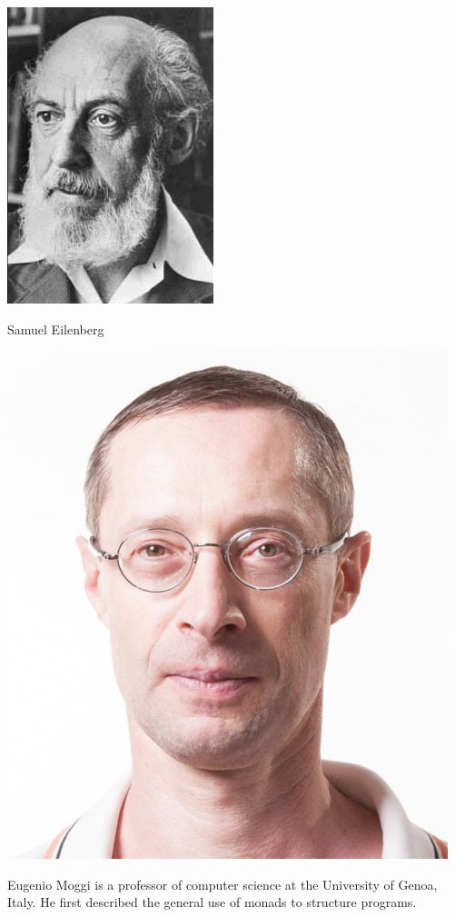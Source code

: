 \documentclass[12pt]{article}
\begin{document}
\begin{center}
\includegraphics[scale=0.6]{eilenberg}

Samuel Eilenberg
\end{center}

\begin{center}
\includegraphics[scale=0.3]{moggi}
\end{center}

Eugenio Moggi is a professor of computer science at the University of Genoa, Italy.
He first described the general use of monads to structure programs.
\end{document}
